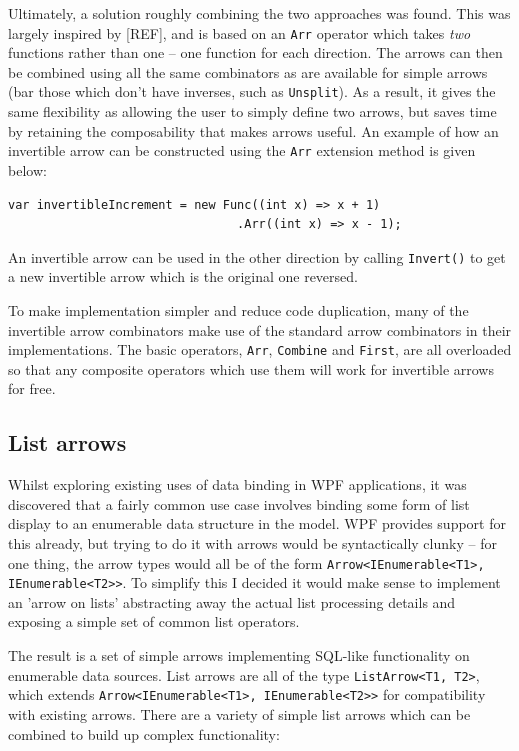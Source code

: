 \documentclass[12pt,twoside,notitlepage]{report}
\begin{document}
Ultimately, a solution roughly combining the two approaches was found. This was largely inspired by [REF], and is based on an \texttt{Arr} operator which takes \textit{two} functions rather than one -- one function for each direction. The arrows can then be combined using all the same combinators as are available for simple arrows (bar those which don't have inverses, such as \texttt{Unsplit}). As a result, it gives the same flexibility as allowing the user to simply define two arrows, but saves time by retaining the composability that makes arrows useful. An example of how an invertible arrow can be constructed using the \texttt{Arr} extension method is given below:

\begin{lstlisting}[language={[Sharp]C}]
var invertibleIncrement = new Func((int x) => x + 1)
                                .Arr((int x) => x - 1);
\end{lstlisting}

An invertible arrow can be used in the other direction by calling \texttt{Invert()} to get a new invertible arrow which is the original one reversed.

To make implementation simpler and reduce code duplication, many of the invertible arrow combinators make use of the standard arrow combinators in their implementations. The basic operators, \texttt{Arr}, \texttt{Combine} and \texttt{First}, are all overloaded so that any composite operators which use them will work for invertible arrows for free.

\subsection{List arrows}

Whilst exploring existing uses of data binding in WPF applications, it was discovered that a fairly common use case involves binding some form of list display to an enumerable data structure in the model. WPF provides support for this already, but trying to do it with arrows would be syntactically clunky -- for one thing, the arrow types would all be of the form \texttt{Arrow<IEnumerable<T1>, IEnumerable<T2>>}. To simplify this I decided it would make sense to implement an 'arrow on lists' abstracting away the actual list processing details and exposing a simple set of common list operators.

The result is a set of simple arrows implementing SQL-like functionality on enumerable data sources. List arrows are all of the type \texttt{ListArrow<T1, T2>}, which extends \texttt{Arrow<IEnumerable<T1>, IEnumerable<T2>>} for compatibility with existing arrows. There are a variety of simple list arrows which can be combined to build up complex functionality:
\end{document}
